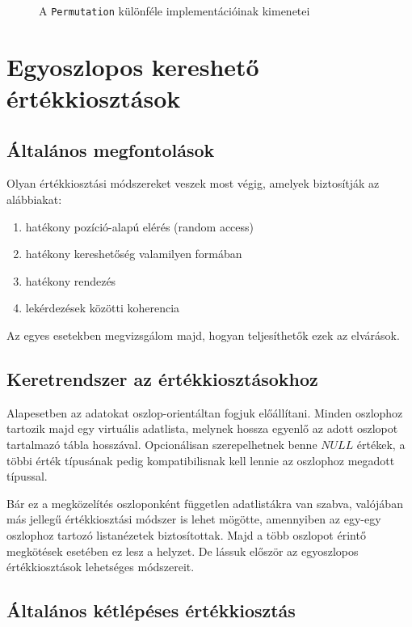 \documentclass[
    parspace,
    noindent,
    nohyp,
]{elteiktdk}[2023/04/10]
\begin{document}
\begin{figure}[H]
  \caption[Permutációk kimeneteinek összehasonlítása]{
    A \texttt{Permutation} különféle implementációinak kimenetei
  }
\label{figure:permutations}
\end{figure}


\section{Egyoszlopos kereshető értékkiosztások}

\subsection{Általános megfontolások}

Olyan értékkiosztási módszereket veszek most végig,
amelyek biztosítják az alábbiakat:

\begin{enumerate}
  \item hatékony pozíció-alapú elérés (random access)
  \item hatékony kereshetőség valamilyen formában
  \item hatékony rendezés
  \item lekérdezések közötti koherencia
\end{enumerate}

Az egyes esetekben megvizsgálom majd, hogyan teljesíthetők ezek az elvárások.

\subsection{Keretrendszer az értékkiosztásokhoz}

Alapesetben az adatokat oszlop-orientáltan fogjuk előállítani.
Minden oszlophoz tartozik majd egy virtuális adatlista,
melynek hossza egyenlő az adott oszlopot tartalmazó tábla hosszával.
Opcionálisan szerepelhetnek benne $NULL$ értékek,
a többi érték típusának pedig kompatibilisnak kell lennie az oszlophoz megadott típussal.

Bár ez a megközelítés oszloponként független adatlistákra van szabva,
valójában más jellegű értékkiosztási módszer is lehet mögötte,
amennyiben az egy-egy oszlophoz tartozó listanézetek biztosítottak.
Majd a több oszlopot érintő megkötések esetében ez lesz a helyzet.
De lássuk először az egyoszlopos értékkiosztások lehetséges módszereit.

\subsection{Általános kétlépéses értékkiosztás}
\end{document}
